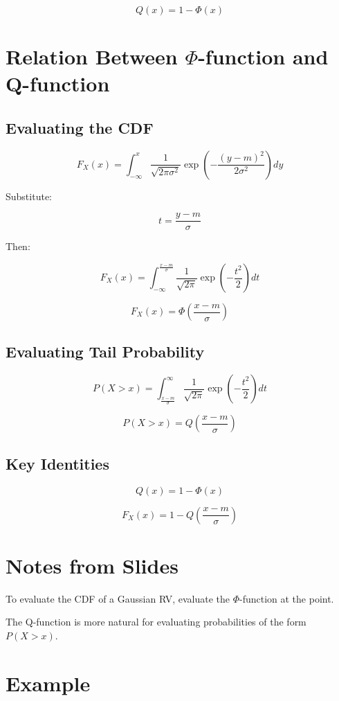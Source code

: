 \documentclass[12pt]{article}
\begin{document}
\[
Q(x) = 1 - \Phi(x)
\]

\section*{Relation Between $\Phi$-function and Q-function}

\subsection*{Evaluating the CDF}

\[
F_X(x) = \int_{-\infty}^x \frac{1}{\sqrt{2\pi\sigma^2}} 
\exp\left(-\frac{(y-m)^2}{2\sigma^2}\right) dy
\]

Substitute:

\[
t = \frac{y-m}{\sigma}
\]

Then:

\[
F_X(x) = \int_{-\infty}^{\frac{x-m}{\sigma}} \frac{1}{\sqrt{2\pi}}
\exp\left(-\frac{t^2}{2}\right) dt
\]

\[
F_X(x) = \Phi\left(\frac{x-m}{\sigma}\right)
\]

\subsection*{Evaluating Tail Probability}

\[
P(X>x) = \int_{\frac{x-m}{\sigma}}^{\infty} \frac{1}{\sqrt{2\pi}}
\exp\left(-\frac{t^2}{2}\right) dt
\]

\[
P(X>x) = Q\left(\frac{x-m}{\sigma}\right)
\]

\subsection*{Key Identities}

\[
Q(x) = 1 - \Phi(x)
\]

\[
F_X(x) = 1 - Q\left(\frac{x-m}{\sigma}\right)
\]

\section*{Notes from Slides}

To evaluate the CDF of a Gaussian RV, evaluate the $\Phi$-function at the point.

The Q-function is more natural for evaluating probabilities of the form $P(X>x)$.

\section*{Example}
\end{document}
